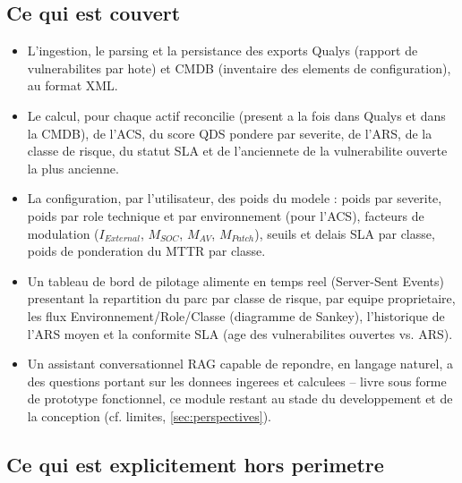 \subsection{Ce qui est couvert}

\begin{itemize}
  \item L'ingestion, le parsing et la persistance des exports Qualys (rapport de
  vulnerabilites par hote) et CMDB (inventaire des elements de configuration), au
  format XML.
  \item Le calcul, pour chaque actif reconcilie (present a la fois dans Qualys et
  dans la CMDB), de l'ACS, du score QDS pondere par severite, de l'ARS, de la classe
  de risque, du statut SLA et de l'anciennete de la vulnerabilite ouverte la plus
  ancienne.
  \item La configuration, par l'utilisateur, des poids du modele : poids par
  severite, poids par role technique et par environnement (pour l'ACS), facteurs de
  modulation ($I_{External}$, $M_{SOC}$, $M_{AV}$, $M_{Patch}$), seuils et delais SLA
  par classe, poids de ponderation du MTTR par classe.
  \item Un tableau de bord de pilotage alimente en temps reel (Server-Sent Events)
  presentant la repartition du parc par classe de risque, par equipe proprietaire,
  les flux Environnement/Role/Classe (diagramme de Sankey), l'historique de l'ARS
  moyen et la conformite SLA (age des vulnerabilites ouvertes vs. ARS).
  \item Un assistant conversationnel RAG capable de repondre, en langage naturel, a
  des questions portant sur les donnees ingerees et calculees -- livre sous forme de
  prototype fonctionnel, ce module restant au stade du developpement et de la
  conception (cf. limites, \cref{sec:perspectives}).
\end{itemize}

\subsection{Ce qui est explicitement hors perimetre}

